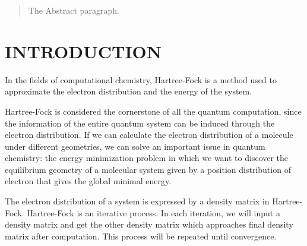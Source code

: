 \documentclass[twoside]{article}
\begin{document}
%

%


\begin{abstract}
  The Abstract paragraph.
\end{abstract}

\section{INTRODUCTION}
In the fields of computational chemistry, Hartree-Fock is a method used to approximate the electron distribution and the energy of the system. 


Hartree-Fock is considered the cornerstone of all the quantum computation, since the information of the entire quantum system can be induced through the electron distribution. If we can calculate the electron distribution of a molecule under different geometries, we can solve an important issue in quantum chemistry: the energy minimization problem in which we want to discover the equilibrium geometry of a molecular system given by a position distribution of electron that gives the global minimal energy. 

 
 
The electron distribution of a system is expressed by a density matrix in Hartree-Fock.
Hartree-Fock is an iterative process. In each iteration, we will input a density matrix and get the other density matrix which approaches final density matrix after computation. This process will be repeated until convergence.
\end{document}
